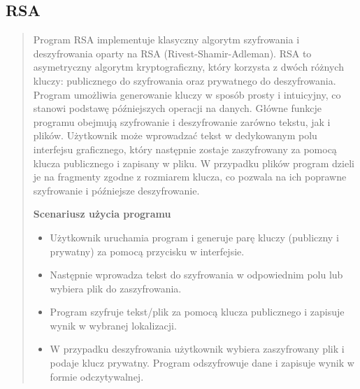 \documentclass[12pt,a4paper]{article}
\begin{document}
\subsection{RSA}
\begin{quotation} \noindent Program RSA implementuje klasyczny algorytm szyfrowania i deszyfrowania oparty na RSA (Rivest-Shamir-Adleman). RSA to asymetryczny algorytm kryptograficzny, który korzysta z dwóch różnych kluczy: publicznego do szyfrowania oraz prywatnego do deszyfrowania. Program umożliwia generowanie kluczy w sposób prosty i intuicyjny, co stanowi podstawę późniejszych operacji na danych. Główne funkcje programu obejmują szyfrowanie i deszyfrowanie zarówno tekstu, jak i plików. Użytkownik może wprowadzać tekst w dedykowanym polu interfejsu graficznego, który następnie zostaje zaszyfrowany za pomocą klucza publicznego i zapisany w pliku. W przypadku plików program dzieli je na fragmenty zgodne z rozmiarem klucza, co pozwala na ich poprawne szyfrowanie i późniejsze deszyfrowanie.\newline

\noindent\textbf{Scenariusz użycia programu}
\begin{itemize}
\item Użytkownik uruchamia program i generuje parę kluczy (publiczny i prywatny) za pomocą przycisku w interfejsie.
\item Następnie wprowadza tekst do szyfrowania w odpowiednim polu lub wybiera plik do zaszyfrowania.
\item Program szyfruje tekst/plik za pomocą klucza publicznego i zapisuje wynik w wybranej lokalizacji.
\item W przypadku deszyfrowania użytkownik wybiera zaszyfrowany plik i podaje klucz prywatny. Program odszyfrowuje dane i zapisuje wynik w formie odczytywalnej.
\end{itemize}
\end{quotation}
\end{document}
